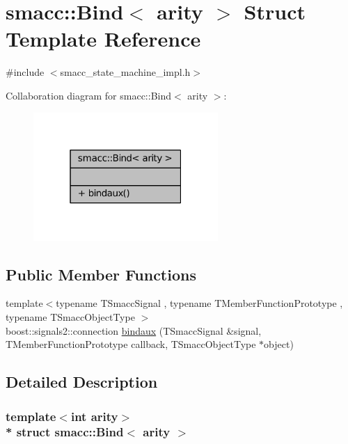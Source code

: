 \hypertarget{structsmacc_1_1Bind}{}\section{smacc\+:\+:Bind$<$ arity $>$ Struct Template Reference}
\label{structsmacc_1_1Bind}


{\ttfamily \#include $<$smacc\+\_\+state\+\_\+machine\+\_\+impl.\+h$>$}



Collaboration diagram for smacc\+:\+:Bind$<$ arity $>$\+:
\nopagebreak
\begin{figure}[H]
\begin{center}
\leavevmode
\includegraphics[width=199pt]{structsmacc_1_1Bind__coll__graph}
\end{center}
\end{figure}
\subsection*{Public Member Functions}
\begin{DoxyCompactItemize}
\item 
{\footnotesize template$<$typename T\+Smacc\+Signal , typename T\+Member\+Function\+Prototype , typename T\+Smacc\+Object\+Type $>$ }\\boost\+::signals2\+::connection \hyperlink{structsmacc_1_1Bind_a1e91999cbea400f14f3b865396df72a9}{bindaux} (T\+Smacc\+Signal \&signal, T\+Member\+Function\+Prototype callback, T\+Smacc\+Object\+Type $\ast$object)
\end{DoxyCompactItemize}


\subsection{Detailed Description}
\subsubsection*{template$<$int arity$>$\\*
struct smacc\+::\+Bind$<$ arity $>$}



